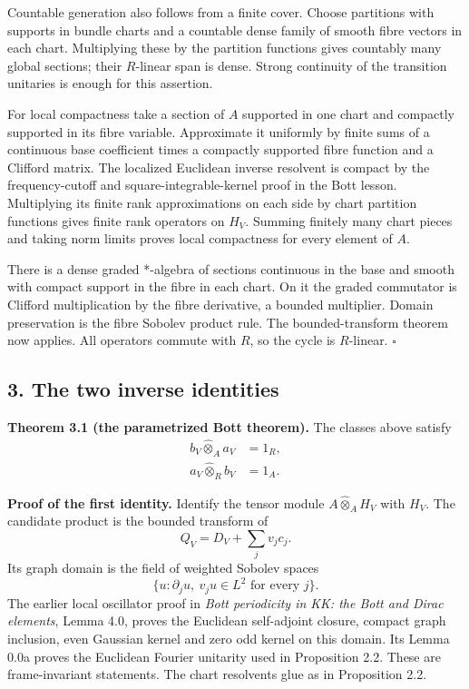 \documentclass[
  11pt,
]{article}
\begin{document}
Countable generation also follows from a finite cover. Choose partitions
with supports in bundle charts and a countable dense family of smooth
fibre vectors in each chart. Multiplying these by the partition
functions gives countably many global sections; their \(R\)-linear span
is dense. Strong continuity of the transition unitaries is enough for
this assertion.

For local compactness take a section of \(A\) supported in one chart and
compactly supported in its fibre variable. Approximate it uniformly by
finite sums of a continuous base coefficient times a compactly supported
fibre function and a Clifford matrix. The localized Euclidean inverse
resolvent is compact by the frequency-cutoff and
square-integrable-kernel proof in the Bott lesson. Multiplying its
finite rank approximations on each side by chart partition functions
gives finite rank operators on \(H_V\). Summing finitely many chart
pieces and taking norm limits proves local compactness for every element
of \(A\).

There is a dense graded *-algebra of sections continuous in the base and
smooth with compact support in the fibre in each chart. On it the graded
commutator is Clifford multiplication by the fibre derivative, a bounded
multiplier. Domain preservation is the fibre Sobolev product rule. The
bounded-transform theorem now applies. All operators commute with \(R\),
so the cycle is \(R\)-linear. \(\square\)

\subsection{3. The two inverse
identities}\label{the-two-inverse-identities}

\textbf{Theorem 3.1 (the parametrized Bott theorem).} The classes above
satisfy \[
\begin{aligned}
b_V\widehat\otimes_A a_V&=1_R,\\
a_V\widehat\otimes_R b_V&=1_A.
\end{aligned}
\tag{3.1}
\]

\textbf{Proof of the first identity.} Identify the tensor module
\(A\widehat\otimes_A H_V\) with \(H_V\). The candidate product is the
bounded transform of \[
Q_V=D_V+\sum_jv_jc_j.
\tag{3.2}
\] Its graph domain is the field of weighted Sobolev spaces \[
\{u:\partial_j u,\ v_j u\in L^2\text{ for every }j\}.
\tag{3.3}
\] The earlier local oscillator proof in \emph{Bott periodicity in KK:
the Bott and Dirac elements}, Lemma 4.0, proves the Euclidean
self-adjoint closure, compact graph inclusion, even Gaussian kernel and
zero odd kernel on this domain. Its Lemma 0.0a proves the Euclidean
Fourier unitarity used in Proposition 2.2. These are frame-invariant
statements. The chart resolvents glue as in Proposition 2.2.
\end{document}
